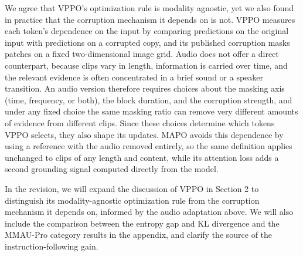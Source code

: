 We agree that VPPO's optimization rule is modality agnostic, yet we also found in practice that the corruption mechanism it depends on is not. VPPO measures each token's dependence on the input by comparing predictions on the original input with predictions on a corrupted copy, and its published corruption masks patches on a fixed two-dimensional image grid. Audio does not offer a direct counterpart, because clips vary in length, information is carried over time, and the relevant evidence is often concentrated in a brief sound or a speaker transition. An audio version therefore requires choices about the masking axis (time, frequency, or both), the block duration, and the corruption strength, and under any fixed choice the same masking ratio can remove very different amounts of evidence from different clips. Since these choices determine which tokens VPPO selects, they also shape its updates. MAPO avoids this dependence by using a reference with the audio removed entirely, so the same definition applies unchanged to clips of any length and content, while its attention loss adds a second grounding signal computed directly from the model.

In the revision, we will expand the discussion of VPPO in Section 2 to distinguish its modality-agnostic optimization rule from the corruption mechanism it depends on, informed by the audio adaptation above. We will also include the comparison between the entropy gap and KL divergence and the MMAU-Pro category results in the appendix, and clarify the source of the instruction-following gain.
